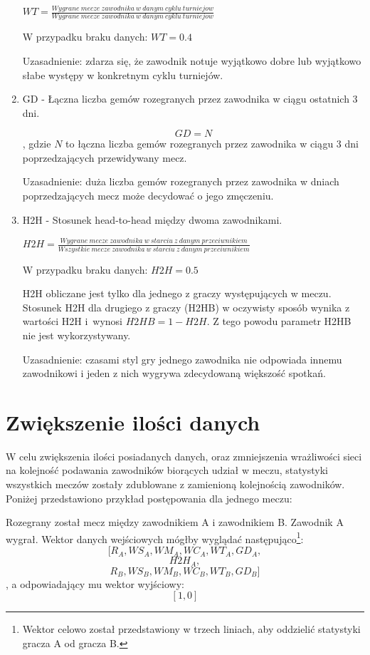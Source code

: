 \begin{enumerate}
$WT = \frac{Wygrane\ mecze\ zawodnika\ w\ danym\ cyklu\ turniejow}{Wygrane\ mecze\ zawodnika\ w\ danym\ cyklu\ turniejow}$

W przypadku braku danych: $WT = 0.4$

Uzasadnienie: zdarza się, że zawodnik notuje wyjątkowo dobre lub wyjątkowo słabe występy w konkretnym cyklu turniejów.

\item GD - Łączna liczba gemów rozegranych przez zawodnika w ciągu ostatnich 3 dni.

$$GD = N$$, gdzie $N$ to łączna liczba gemów rozegranych przez zawodnika w ciągu 3 dni poprzedzających przewidywany mecz.

Uzasadnienie: duża liczba gemów rozegranych przez zawodnika w dniach poprzedzających mecz może decydować o jego zmęczeniu.

\item H2H - Stosunek head-to-head między dwoma zawodnikami.

$H2H = \frac{Wygrane\ mecze\ zawodnika\ w\ starciu\ z\ danym\ przeciwnikiem}{Wszystkie\ mecze\ zawodnika\ w\ starciu\ z\ danym\ przeciwnikiem}$

W przypadku braku danych: $H2H = 0.5$

H2H obliczane jest tylko dla jednego z graczy występujących w meczu. Stosunek H2H dla drugiego z graczy (H2HB) w oczywisty sposób wynika z wartości H2H i~wynosi $H2HB = 1 - H2H$. Z tego powodu parametr H2HB nie jest wykorzystywany.

Uzasadnienie: czasami styl gry jednego zawodnika nie odpowiada innemu zawodnikowi i jeden z nich wygrywa zdecydowaną większość spotkań.

\end{enumerate}

\section{Zwiększenie ilości danych}
\label{Sec:DataDouble}

W celu zwiększenia ilości posiadanych danych, oraz zmniejszenia wrażliwości sieci na kolejność podawania zawodników biorących udział w meczu, statystyki wszystkich meczów zostały zdublowane z zamienioną kolejnością zawodników. Poniżej przedstawiono przykład postępowania dla jednego meczu:

Rozegrany został mecz między zawodnikiem A i zawodnikiem B. Zawodnik A wygrał. Wektor danych wejściowych mógłby wyglądać następująco\footnote{Wektor celowo został przedstawiony w trzech liniach, aby oddzielić statystyki gracza A od gracza B.}: $$[R_A, WS_A, WM_A, WC_A, WT_A, GD_A,$$
$$H2H_A,$$  
$$R_B, WS_B, WM_B, WC_B, WT_B, GD_B]$$
, a odpowiadający mu wektor wyjściowy: $$[1, 0]$$

